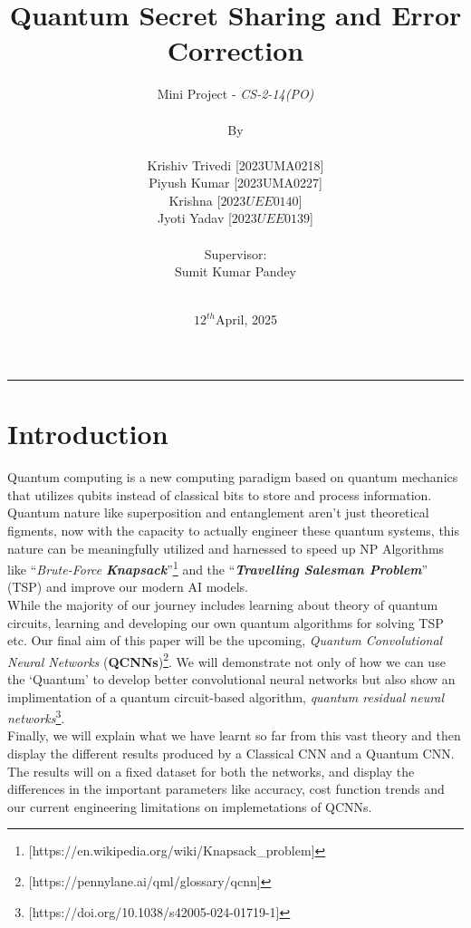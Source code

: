\documentclass[a4paper]{article}
\title{Quantum Secret Sharing and Error Correction}
\author{
Mini Project - \emph{CS-2-14(PO)}  \\\\  \small{By} \\\\  Krishiv Trivedi\hspace{0.2cm} [2023UMA0218] \\ Piyush Kumar \hspace{0.193cm} [2023UMA0227] \\ Krishna \hspace{1.58cm}[$2023UEE0140$] \\ Jyoti Yadav \hspace{0.86cm}[$2023UEE0139$] \\\\ \small{Supervisor:} \\ Sumit Kumar Pandey \\ \hspace{0.94cm}\\
}
\date{$12^{th}$April, 2025}
\begin{document}
\maketitle
\hrule
\section*{Introduction}
Quantum computing is a new computing paradigm based on quantum
mechanics that utilizes qubits instead of classical bits to store and process
information. Quantum nature like superposition and entanglement aren't just theoretical figments, now with the capacity to actually engineer these quantum systems, this nature can be meaningfully utilized and harnessed to speed up NP Algorithms like ``\emph{Brute-Force} \emph{\textbf{Knapsack}}''\footnote{[https://en.wikipedia.org/wiki/Knapsack\_problem]} and the ``\emph{\textbf{Travelling Salesman Problem}}'' (TSP) and improve our modern AI models.\\

 While the majority of our journey includes learning about theory of quantum circuits, learning and developing our own quantum algorithms for solving TSP etc. Our final aim of this paper will be the upcoming, \emph{Quantum Convolutional Neural Networks} (\textbf{QCNNs})\footnote{[https://pennylane.ai/qml/glossary/qcnn]}. We will demonstrate not only of how we can use the `Quantum' to develop better convolutional neural networks but also show an implimentation of a quantum circuit-based algorithm, \emph{quantum residual neural networks}\footnote{[https://doi.org/10.1038/s42005-024-01719-1]}.\\

Finally, we will explain what we have learnt so far from this vast theory and then display the different results produced by a Classical CNN and a Quantum CNN. The results will on a fixed dataset for both the networks, and display the differences in the important parameters like accuracy, cost function trends and our current engineering limitations on implemetations of QCNNs.
\end{document}
